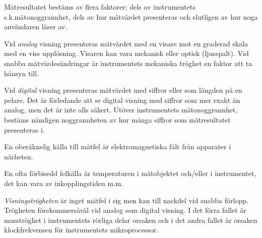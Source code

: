 Mätresultatet bestäms av flera faktorer; dels av instrumentets
s.k.mätonoggrannhet, dels av hur mätvärdet presenteras och slutligen
av hur noga användaren läser av.

Vid \emph{analog} visning presenteras mätvärdet med en visare mot en
graderad skala med en viss upplösning. Visaren kan vara mekanisk eller
optisk (ljusspalt). Vid snabba mätvärdesändringar är instrumentets
mekaniska tröghet en faktor att ta hänsyn till.

Vid \emph{digital} visning presenteras mätvärdet med siffror eller som
längden på en pelare.  Det är förledande att se digital visning med
siffror som mer exakt än analog, men det är inte alls säkert. Utöver
instrumentets mätonoggrannhet, bestäms nämligen noggrannheten av hur
många siffror som mätresultatet presenteras i.

En oberäknelig källa till mätfel är elektromagnetiska fält från
apparater i närheten.

En ofta förbisedd felkälla är temperaturen i mätobjektet och/eller i
instrumentet, det kan vara av inkopplingstiden m.m.

\emph{Visningströgheten} är inget mätfel i sig men kan till nackdel
vid snabba förlopp.  Trögheten förekommersåväl vid analog som digital
visning. I det förra fallet är masströghet i instrumentets rörliga
delar orsaken och i det andra fallet är orsaken klockfrekvensen för
instrumentets mikroprocessor.

